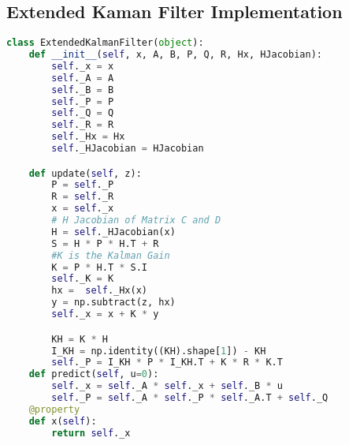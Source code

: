 \subsection{Extended Kaman Filter Implementation}\label{sec:Extended Kaman Filter Implementation}

\begin{lstlisting}[language=Python, caption=Extended Kalaman Filter Script]  
class ExtendedKalmanFilter(object):
    def __init__(self, x, A, B, P, Q, R, Hx, HJacobian):
        self._x = x
        self._A = A
        self._B = B
        self._P = P
        self._Q = Q
        self._R = R
        self._Hx = Hx
        self._HJacobian = HJacobian

    def update(self, z):
        P = self._P
        R = self._R
        x = self._x
        # H Jacobian of Matrix C and D
        H = self._HJacobian(x)
        S = H * P * H.T + R
        #K is the Kalman Gain 
        K = P * H.T * S.I
        self._K = K
        hx =  self._Hx(x)
        y = np.subtract(z, hx)
        self._x = x + K * y

        KH = K * H
        I_KH = np.identity((KH).shape[1]) - KH
        self._P = I_KH * P * I_KH.T + K * R * K.T
    def predict(self, u=0):
        self._x = self._A * self._x + self._B * u
        self._P = self._A * self._P * self._A.T + self._Q
    @property
    def x(self):
        return self._x
\end{lstlisting}